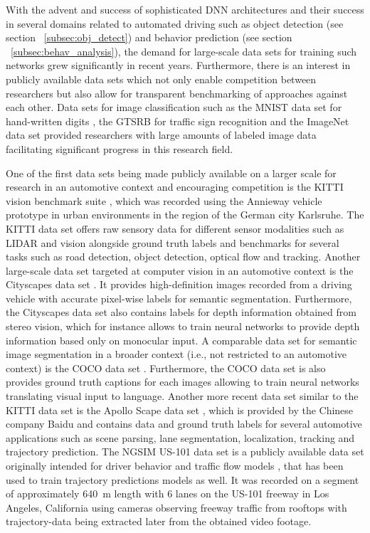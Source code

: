 With the advent and success of sophisticated \ac{DNN} architectures and their success in several domains related to automated driving such as object detection (see section ~\ref{subsec:obj_detect}) and behavior prediction (see section ~\ref{subsec:behav_analysis}), the demand for large-scale data sets for training such networks grew significantly in recent years.
Furthermore, there is an interest in publicly available data sets which not only enable competition between researchers but also allow for transparent benchmarking of approaches against each other.
Data sets for image classification such as the \ac{MNIST} data set for hand-written digits \cite{LeCun1998} , the \ac{GTSRB} for traffic sign recognition \cite{Stallkamp2012} and the ImageNet data set \cite{Deng2009} provided researchers with large amounts of labeled image data facilitating significant progress in this research field.

One of the first data sets being made publicly available on a larger scale for research in an automotive context and encouraging competition is the KITTI vision benchmark suite \cite{Geiger2013a}, which was recorded using the Annieway vehicle prototype \cite{Annieway} in urban environments in the region of the German city Karlsruhe.
The KITTI data set offers raw sensory data for different sensor modalities such as \ac{LIDAR} and vision alongside ground truth labels and benchmarks for several tasks such as road detection, object detection, optical flow and tracking.
Another large-scale data set targeted at computer vision in an automotive context is the Cityscapes data set \cite{Cordts2016}. 
It provides high-definition images recorded from a driving vehicle with accurate pixel-wise labels for semantic segmentation.
Furthermore, the Cityscapes data set also contains labels for depth information obtained from stereo vision, which for instance allows to train neural networks to provide depth information based only on monocular input. 
A comparable data set for semantic image segmentation in a broader context (i.e., not restricted to an automotive context) is the 
\ac{COCO}  data set \cite{Lin2014}.
Furthermore, the \ac{COCO} data set is also provides ground truth captions for each images allowing to train neural networks translating visual input to language. 
Another more recent data set similar to the KITTI data set is the Apollo Scape data set \cite{Huang2018}, which is provided by the Chinese company Baidu and contains data and ground truth labels for several automotive applications such as scene parsing, lane segmentation, localization, tracking and trajectory prediction.
The \ac{NGSIM} US-101 data set \cite{NGSIM-US101} is a publicly available data set originally intended for driver behavior and traffic flow models \cite{He2017}, that has been used to train trajectory predictions models \cite{Altche2018, Deo2018} as well.
It was recorded on a segment of approximately \SI{640}{\meter} length with \num{6} lanes on the US-101 freeway in Los Angeles, California  using cameras observing freeway traffic from rooftops with trajectory-data being extracted later from the obtained video footage.

